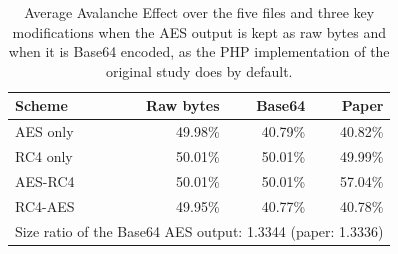\begin{table}[htbp]
\centering
\caption{Average Avalanche Effect over the five files and three key modifications when the AES output is kept as raw bytes and when it is Base64 encoded, as the PHP implementation of the original study does by default.}
\label{tab:p3_base64}
\small
\begin{tabular}{lrrr}
\toprule
\textbf{Scheme} & \textbf{Raw bytes} & \textbf{Base64} & \textbf{Paper} \\
\midrule
AES only & 49.98\% & 40.79\% & 40.82\% \\
RC4 only & 50.01\% & 50.01\% & 49.99\% \\
AES-RC4 & 50.01\% & 50.01\% & 57.04\% \\
RC4-AES & 49.95\% & 40.77\% & 40.78\% \\
\midrule
\multicolumn{4}{l}{Size ratio of the Base64 AES output: 1.3344 (paper: 1.3336)} \\
\bottomrule
\end{tabular}
\end{table}
